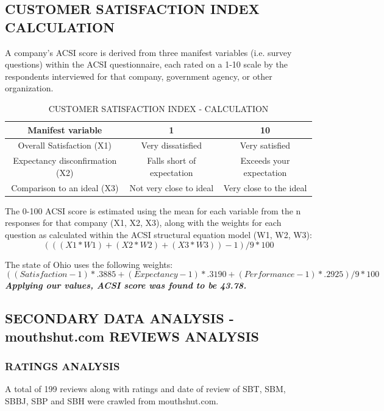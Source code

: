 \documentclass[a4paper, 12pt]{extarticle}
\begin{document}
{\subsection{CUSTOMER SATISFACTION INDEX CALCULATION}
A company's ACSI score is derived from three manifest variables (i.e. survey questions) within the ACSI questionnaire, each rated on a 1-10 scale by the respondents interviewed for that company, government agency, or other organization.

\begin{table}[H]
\centering
\begin{tabular}{|c|c|c|}
\hline
\textbf{Manifest variable} & 1 & 10 \\
\hline
Overall Satisfaction (X1) & Very dissatisfied & Very satisfied \\
\hline
Expectancy disconfirmation (X2) & Falls short of expectation & Exceeds your expectation \\
\hline
Comparison to an ideal (X3) & Not very close to ideal & Very close to the ideal\\
\hline
\end{tabular}
\caption{CUSTOMER SATISFACTION INDEX - CALCULATION}
\end{table}
The 0-100 ACSI score is estimated using the mean for each variable from the n responses for that company (X1, X2, X3), along with the weights for each question as calculated within the ACSI structural equation model (W1, W2, W3):\\ 
\[ (((X1*W1)+(X2*W2)+(X3*W3))-1)/9*100 \]
\par The state of Ohio uses the following weights: \\
\[ ((Satisfaction-1)*.3885 + (Expectancy-1)*.3190 + (Performance-1)*.2925) / 9 * 100 \]
\textbf{\emph{Applying our values, ACSI score was found to be 43.78.}}

\subsection{SECONDARY DATA ANALYSIS - mouthshut.com REVIEWS ANALYSIS}
\subsubsection{RATINGS ANALYSIS}
A total of 199 reviews along with ratings and date of review of SBT, SBM, SBBJ, SBP and SBH were crawled from mouthshut.com.

}
\end{document}
